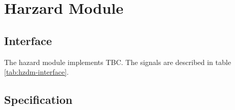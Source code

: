 \section{Harzard Module}

  \subsection{Interface}

    \begin{content}
        The hazard module implements TBC. The signals are described in table \ref{tab:hzdm-interface}. 
      \end{content}

    

  \subsection{Specification}

\newpage
